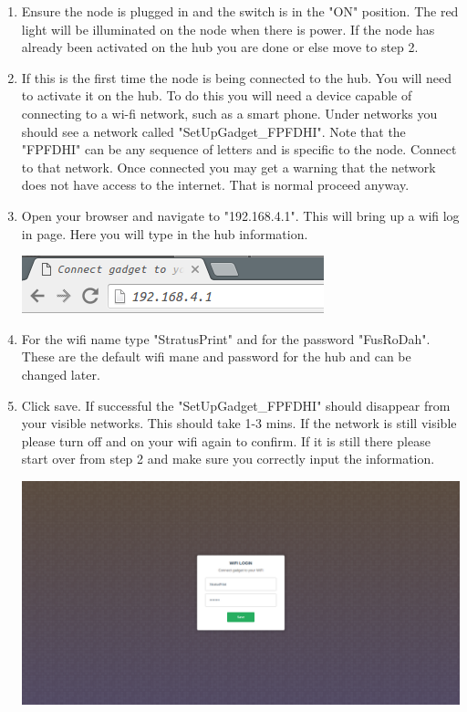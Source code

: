     \begin{enumerate}
      \item Ensure the node is plugged in and the switch is in the "ON" position.
      The red light will be illuminated on the node when there is power. If the node
      has already been activated on the hub you are done or else move to step 2.

      \item If this is the first time the node is being connected to the hub.
      You will need to activate it on the hub. To do this you will need a device
      capable of connecting to a wi-fi network, such as a smart phone. Under networks
      you should see a network called "SetUpGadget\_FPFDHI". Note that the "FPFDHI"
      can be any sequence of letters and is specific to the node. Connect to that network.
      Once connected you may get a warning that the network does not have access
      to the internet. That is normal proceed anyway.

      \item Open your browser and navigate to "192.168.4.1". This will bring up
      a wifi log in page. Here you will type in the hub information.
      \begin{center}
      \includegraphics[scale=1]{images/ip-enter.png}
    \end{center}

      \item For the wifi name type "StratusPrint" and for the password "FusRoDah".
      These are the default wifi mane and password for the hub and can be changed later.

      \item Click save. If successful the "SetUpGadget\_FPFDHI" should disappear
      from your visible networks. This should take 1-3 mins. If the network is still
      visible please turn off and on your wifi again to confirm. If it is still there
      please start over from step 2 and make sure you correctly input the information.
      \begin{center}
      \includegraphics[scale=0.25]{images/wifi-login.png}
    \end{center}
    \end{enumerate}


